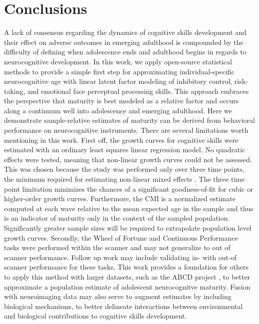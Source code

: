 \documentclass{article}%
\begin{document}
\section*{Conclusions} A lack of consensus regarding the dynamics of cognitive skills development and their effect on adverse outcomes in emerging adulthood is compounded by the difficulty of defining when adolescence ends and adulthood begins in regards to neurocognitive development. In this work, we apply open-source statistical methods to provide a simple first step for approximating individual-specific neurocognitive age with linear latent factor modeling of inhibitory control, risk-taking, and emotional face perceptual processing skills.  This approach embraces the perspective that maturity is best modeled as a relative factor and occurs along a continuum well into adolescence and emerging adulthood. Here we demonstrate sample-relative estimates of maturity can be derived from behavioral performance on neurocognitive instruments. There are several limitations worth mentioning in this work. First off, the growth curves for cognitive skills were estimated with an ordinary least squares linear regression model. No quadratic effects were tested, meaning that non-linear growth curves could not be assessed. This was chosen because the study was performed only over three time points, the minimum required for estimating non-linear mixed effects \citep{bollen2006latent}. The three time point limitation minimizes the chances of a significant goodness-of-fit for cubic or higher-order growth curves. Furthermore, the CMI is a normalized estimate computed at each wave relative to the mean expected age in the sample and thus is an indicator of maturity only in the context of the sampled population. Significantly greater sample sizes will be required to extrapolate population level growth curves. Secondly, the Wheel of Fortune and Continuous Performance tasks were performed within the scanner and may not generalize to out of scanner performance. Follow up work may include validating in- with out-of scanner performance for these tasks. This work provides a foundation for others to apply this method with larger datasets, such as the ABCD project \citep{casey2018adolescent,volkow2018conception}, to better approximate a population estimate of adolescent neurocognitve maturity. Fusion with neuroimaging data may also serve to augment estimates by including biological mechanisms, to better delineate interactions between environmental and biological contributions to cognitive skills development.
\end{document}
